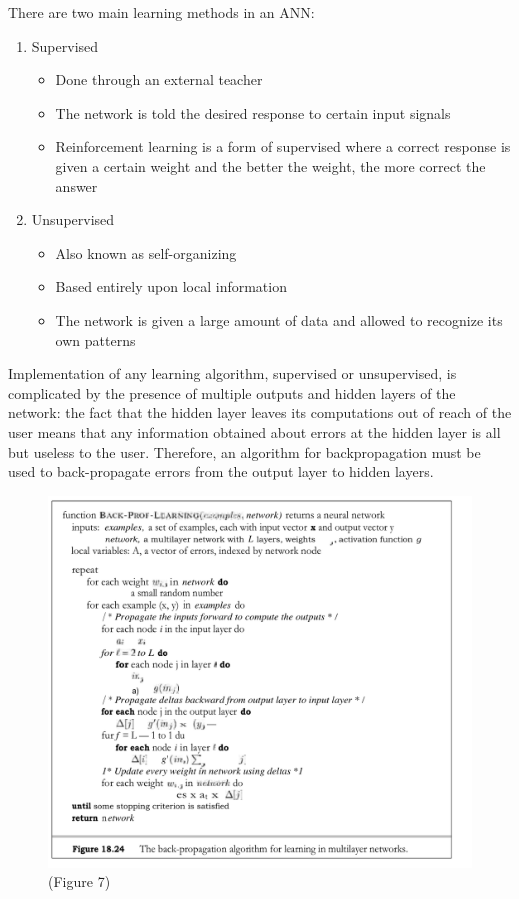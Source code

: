 \documentclass{beamer}
\begin{document}
\begin{frame}
There are two main learning methods in an ANN:
\begin{enumerate}
\item Supervised
\begin{itemize}
\item Done through an external teacher
\item The network is told the desired response to certain input signals
\item Reinforcement learning is a form of supervised where a correct response is given a certain weight and the better the weight, the more correct the answer
\end{itemize}

\item Unsupervised
\begin{itemize}
\item Also known as self-organizing
\item Based entirely upon local information
\item The network is given a large amount of data and allowed to recognize its own patterns
\end{itemize}
\end{enumerate}
\end{frame}

\begin{frame}
Implementation of any learning algorithm, supervised or unsupervised, is complicated by the presence of multiple outputs and hidden layers of the network: the fact that the hidden layer leaves its computations out of reach of the user means that any information obtained about errors at the hidden layer is all but useless to the user. Therefore, an algorithm for backpropagation must be used to back-propagate errors from the output layer to hidden layers.
\end{frame}

\begin{frame}
\begin{figure}
	\center \includegraphics[scale=.195]{backprop.png}
	\center \tiny(Figure 7)
\end{figure}
\end{frame}
\end{document}
